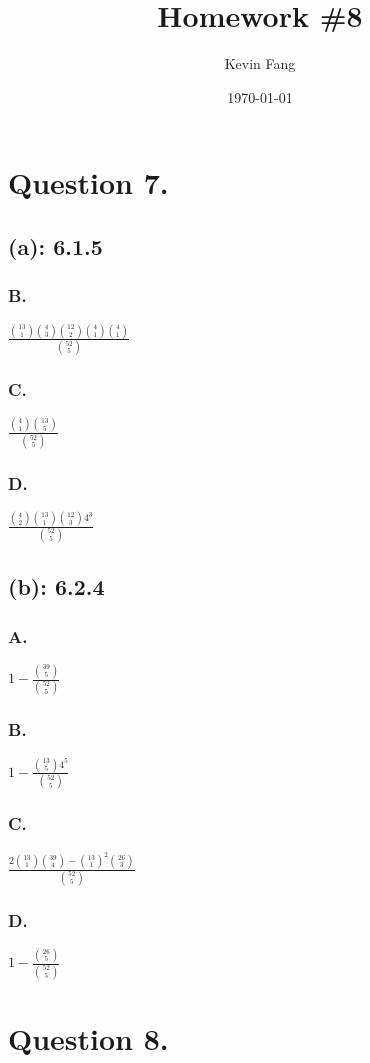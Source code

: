 \documentclass[titlepage]{article}\pagestyle{empty}
\author{Kevin Fang}
\title{Homework \#8}
\date{\today}
\begin{document}
\maketitle

\pagebreak
\section*{Question 7.}
\subsection*{(a): 6.1.5}
\subsubsection*{B.} $\frac{\binom{13}{1}\binom{4}{3}\binom{12}{2}\binom{4}{1}\binom{4}{1}}{\binom{52}{5}}$
\subsubsection*{C.} $\frac{\binom{4}{1}\binom{13}{5}}{\binom{52}{5}}$
\subsubsection*{D.} $\frac{\binom{4}{2}\binom{13}{1}\binom{12}{3}4^3}{\binom{52}{5}}$
\subsection*{(b): 6.2.4}
\subsubsection*{A.} $1 - \frac{\binom{39}{5}}{\binom{52}{5}}$
\subsubsection*{B.} $1 - \frac{\binom{13}{5}4^5}{\binom{52}{5}}$
\subsubsection*{C.} $\frac{2 \binom{13}{1} \binom{39}{4} -  \binom{13}{1}^2  \binom{26}{3}}{\binom{52}{5}}$
\subsubsection*{D.} $1 - \frac{\binom{26}{5}}{\binom{52}{5}}$

\pagebreak
\section*{Question 8.}
\end{document}
